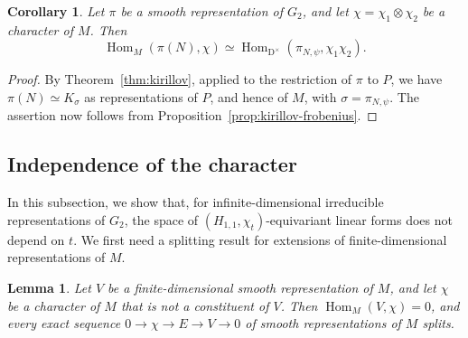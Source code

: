 \documentclass[11pt]{amsart}
\numberwithin{equation}{section}
\theoremstyle{plain}
\newtheorem{lemma}[theorem]{Lemma}
\newtheorem{corollary}[theorem]{Corollary}
\theoremstyle{definition}
\theoremstyle{remark}
\DeclareMathOperator{\Hom}{Hom}
\begin{document}
\begin{corollary}\label{cor:kirillov-hom}
	Let $\pi$ be a smooth representation of $G_2$, and let $\chi=\chi_1\otimes\chi_2$ be a character of $M$. Then
	$$\Hom_M(\pi(N),\chi)\simeq\Hom_{\mathrm{D}^\times}(\pi_{N,\psi},\chi_1\chi_2).$$
\end{corollary}

\begin{proof}
	By Theorem~\ref{thm:kirillov}, applied to the restriction of $\pi$ to $P$, we have $\pi(N)\simeq K_\sigma$ as representations of $P$, and hence of $M$, with $\sigma=\pi_{N,\psi}$. The assertion now follows from Proposition~\ref{prop:kirillov-frobenius}.
\end{proof}

\subsection{Independence of the character}\label{ss:independence}

In this subsection, we show that, for infinite-dimensional irreducible representations of $G_2$, the space of $(H_{1,1},\chi_t)$-equivariant linear forms does not depend on $t$. We first need a splitting result for extensions of finite-dimensional representations of $M$.

\begin{lemma}\label{lem:ext-splitting}
	Let $V$ be a finite-dimensional smooth representation of $M$, and let $\chi$ be a character of $M$ that is not a constituent of $V$. Then $\Hom_M(V,\chi)=0$, and every exact sequence $0\to\chi\to E\to V\to0$ of smooth representations of $M$ splits.
\end{lemma}
\end{document}
